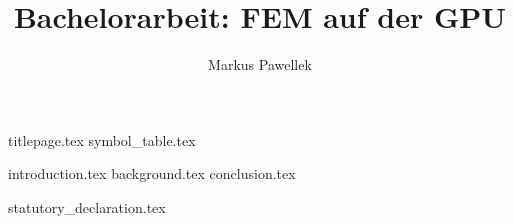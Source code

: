 \documentclass[9pt,fleqn,a4paper]{article}
\title{Bachelorarbeit: FEM auf der GPU}
\author{Markus Pawellek}
\begin{document}
  {titlepage.tex}
  {symbol_table.tex}
  \cleardoublepage
  \tableofcontents

  \cleardoublepage
  {introduction.tex}
  {background.tex}
  {conclusion.tex}

  \cleardoublepage
  \nocite{*}
  
  

  \appendix
  \cleardoublepage

  \cleardoublepage
  {statutory_declaration.tex}
\end{document}
